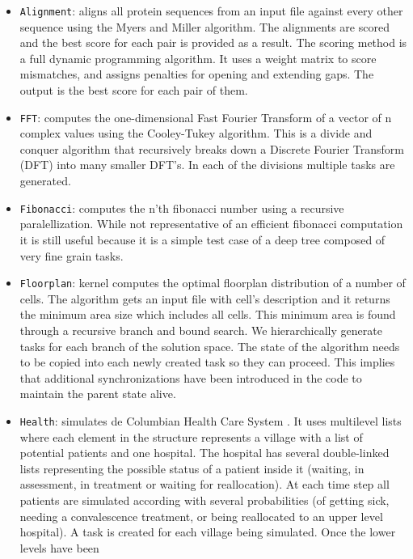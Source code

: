 \documentclass[sigconf]{acmart}
\begin{document}
\begin{itemize}
\item \texttt{Alignment}: aligns all protein sequences from  an  input
file  against  every  other  sequence  using  the Myers  and Miller \cite{}
algorithm. The alignments are scored and the best score for each pair is
provided as a result. The scoring method is  a  full  dynamic  programming
algorithm. It uses  a  weight matrix to score mismatches, and assigns
penalties for opening and extending gaps. The output is the best score for each
pair of them.
\item \texttt{FFT}: computes the one-dimensional Fast Fourier Transform
of a vector of n complex values using the Cooley-Tukey \cite{cooley-tukey}
algorithm. This is a divide and conquer algorithm that  recursively  breaks
down a Discrete Fourier Transform (DFT) into many smaller DFT’s. In each of the
divisions multiple tasks are generated.
\item \texttt{Fibonacci}: computes the n'th fibonacci number using a  recursive
paralellization. While  not  representative  of  an efficient  fibonacci
computation  it  is  still  useful  because  it  is a simple test case of a
deep tree composed of very fine grain tasks.  
\item \texttt{Floorplan}: kernel computes the optimal floorplan distribution
of a number of cells. The algorithm gets an input file with  cell’s
description  and  it  returns  the  minimum  area  size which includes all
cells. This minimum area is found through a recursive branch and bound search.
We hierarchically generate tasks  for  each  branch  of  the  solution  space.
The  state  of  the algorithm needs to be copied into each newly created task
so they can proceed. This implies that additional synchronizations have been
introduced in the code to maintain the parent state alive.
\item \texttt{Health}: simulates de Columbian Health Care System \cite{?}. It
uses multilevel lists where each element in the structure  represents  a
village with  a  list  of  potential patients and one hospital. The hospital
has several double-linked lists representing the possible status of a patient
inside it (waiting, in assessment,   in   treatment   or   waiting   for
reallocation).  At  each time step  all  patients  are  simulated  according
with several probabilities (of getting sick, needing a convalescence treatment,
or  being  reallocated to  an  upper  level  hospital).  A  task  is  created
for  each  village being  simulated.  Once  the lower   levels   have   been

\end{itemize}
\end{document}
